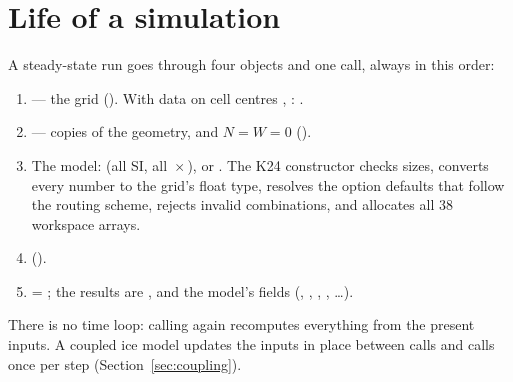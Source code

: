 \section{Life of a simulation}\label{sec:lifecycle}

A steady-state run goes through four objects and one call, always in this order:
\begin{enumerate}[leftmargin=1.5em]
\item {} --- the grid (). With data on cell centres
  , : .
\item {} --- copies of the geometry, and $N = W = 0$ ().
\item The model:  (all SI, all
  \,$\times$\,), or . The K24 constructor checks sizes, converts every number to the
  grid's float type, resolves the option defaults that follow the routing scheme, rejects invalid combinations, and
  allocates all 38 workspace arrays.
\item {} ().
\item {} = ; the results are ,  and the
  model's fields (, , , , \ldots).
\end{enumerate}
There is no time loop: calling  again recomputes everything from the present inputs. A coupled ice model
updates the inputs in place between calls and calls  once per step (Section~\ref{sec:coupling}).

